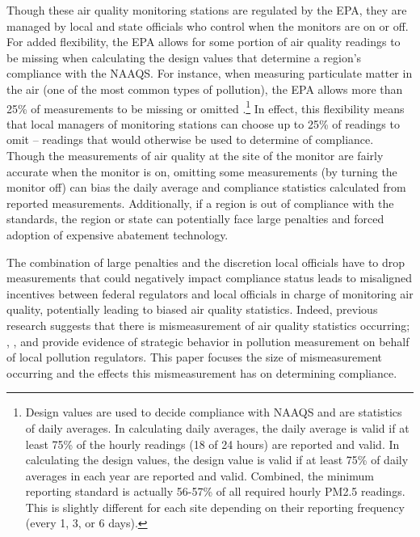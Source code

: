 Though these air quality monitoring stations are regulated by the EPA, they are managed by local and state officials who control when the monitors are on or off.
%
For added flexibility, the EPA allows for some portion of air quality readings to be missing when calculating the design values that determine a region's compliance with the NAAQS.
For instance, when measuring particulate matter in the air (one of the most common types of pollution), the EPA allows more than 25\% of measurements to be missing or omitted \citep{epaAppendixPart502017}.\footnote{Design values are used to decide compliance with NAAQS and are statistics of daily averages. In calculating daily averages, the daily average is valid if at least 75\% of the hourly readings (18 of 24 hours) are reported and valid. In calculating the design values, the design value is valid if at least 75\% of daily averages in each year are reported and valid. Combined, the minimum reporting standard is actually 56-57\% of all required hourly PM2.5 readings. This is slightly different for each site depending on their reporting frequency (every 1, 3, or 6 days). }
%
In effect, this flexibility means that local managers of monitoring stations can choose up to 25\% of readings to omit -- readings that would otherwise be used to determine of compliance.
%
Though the measurements of air quality at the site of the monitor are fairly accurate when the monitor is on, omitting some measurements (by turning the monitor off) can bias the daily average and compliance statistics calculated from reported measurements.
% 
Additionally, if a region is out of compliance with the standards, the region or state can potentially face large penalties and forced adoption of expensive abatement technology.


The combination of large penalties and the discretion local officials have to drop measurements that could negatively impact compliance status leads to misaligned incentives between federal regulators and local officials in charge of monitoring air quality, potentially leading to biased air quality statistics.
%
Indeed, previous research suggests that there is mismeasurement of air quality statistics occurring;
\cite{zouUnwatchedPollutionEffect2021}, \cite{muWhatMissingEnvironmental2021}, \cite{graingerRegulatorsStrategicallyAvoid2019} and \cite{graingerDiscriminationAmbientAir2019} provide evidence of strategic behavior in pollution measurement on behalf of local pollution regulators.
%
This paper focuses the size of mismeasurement occurring and the effects this mismeasurement has on determining compliance.



